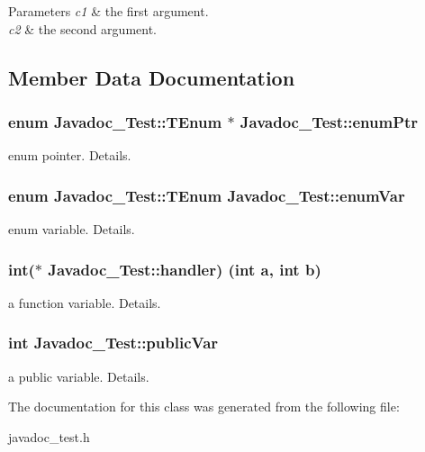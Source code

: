 \begin{DoxyParams}{Parameters}
{\em c1} & the first argument. \\
\hline
{\em c2} & the second argument. \\
\hline
\end{DoxyParams}


\subsection{Member Data Documentation}
\subsubsection[{\texorpdfstring{enum\+Ptr}{enumPtr}}]{\setlength{\rightskip}{0pt plus 5cm}enum {\bf Javadoc\+\_\+\+Test\+::\+T\+Enum} 
       $\ast$ Javadoc\+\_\+\+Test\+::enum\+Ptr}\hypertarget{class_javadoc___test_abcb36df9d8af3e69290c239ba483d6df}{}\label{class_javadoc___test_abcb36df9d8af3e69290c239ba483d6df}
enum pointer. Details. 
\subsubsection[{\texorpdfstring{enum\+Var}{enumVar}}]{\setlength{\rightskip}{0pt plus 5cm}enum {\bf Javadoc\+\_\+\+Test\+::\+T\+Enum}
        Javadoc\+\_\+\+Test\+::enum\+Var}\hypertarget{class_javadoc___test_a689558649150237b53a5c8ed89c996c2}{}\label{class_javadoc___test_a689558649150237b53a5c8ed89c996c2}
enum variable. Details. 
\subsubsection[{\texorpdfstring{handler}{handler}}]{\setlength{\rightskip}{0pt plus 5cm}int($\ast$ Javadoc\+\_\+\+Test\+::handler) (int a, int b)}\hypertarget{class_javadoc___test_ace81a523a4eef44501a841a6d338832b}{}\label{class_javadoc___test_ace81a523a4eef44501a841a6d338832b}
a function variable. Details. 
\subsubsection[{\texorpdfstring{public\+Var}{publicVar}}]{\setlength{\rightskip}{0pt plus 5cm}int Javadoc\+\_\+\+Test\+::public\+Var}\hypertarget{class_javadoc___test_a44a516fbc3a4865e2dcae34649c9df6a}{}\label{class_javadoc___test_a44a516fbc3a4865e2dcae34649c9df6a}
a public variable. Details. 

The documentation for this class was generated from the following file\+:\begin{DoxyCompactItemize}
\item 
javadoc\+\_\+test.\+h\end{DoxyCompactItemize}
